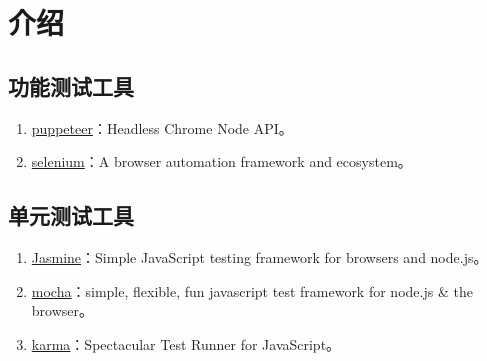 \section{介绍}\label{ux4ecbux7ecd}

\subsection{功能测试工具}\label{ux529fux80fdux6d4bux8bd5ux5de5ux5177}

\begin{enumerate}
\def\labelenumi{\arabic{enumi}.}
\tightlist
\item
  \href{https://github.com/GoogleChrome/puppeteer}{puppeteer}：Headless
  Chrome Node API。
\item
  \href{https://github.com/SeleniumHQ/selenium}{selenium}：A browser
  automation framework and ecosystem。
\end{enumerate}

\subsection{单元测试工具}\label{ux5355ux5143ux6d4bux8bd5ux5de5ux5177}

\begin{enumerate}
\def\labelenumi{\arabic{enumi}.}
\tightlist
\item
  \href{https://github.com/jasmine/jasmine}{Jasmine}：Simple JavaScript
  testing framework for browsers and node.js。
\item
  \href{https://github.com/mochajs/mocha}{mocha}：simple, flexible, fun
  javascript test framework for node.js \& the browser。
\item
  \href{https://github.com/karma-runner/karma}{karma}：Spectacular Test
  Runner for JavaScript。
\end{enumerate}
